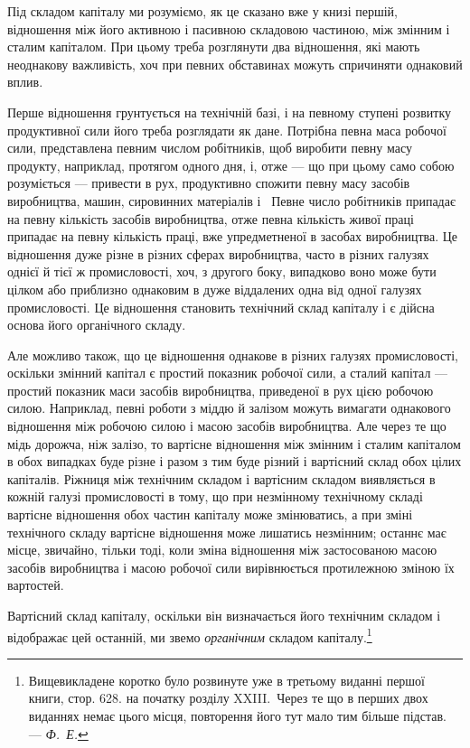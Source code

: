 Під складом капіталу ми розуміємо, як це сказано вже у
книзі першій, відношення між його активною і пасивною складовою
частиною, між змінним і сталим капіталом. При цьому
треба розглянути два відношення, які мають неоднакову важливість,
хоч при певних обставинах можуть спричиняти однаковий
вплив.

Перше відношення грунтується на технічній базі, і на певному
ступені розвитку продуктивної сили його треба розглядати
як дане. Потрібна певна маса робочої сили, представлена
певним числом робітників, щоб виробити певну масу продукту,
наприклад, протягом одного дня, і, отже — що при цьому само
собою розуміється — привести в рух, продуктивно спожити
певну масу засобів виробництва, машин, сировинних матеріалів
і~ Певне число робітників припадає на певну кількість засобів
виробництва, отже певна кількість живої праці припадає
на певну кількість праці, вже упредметненої в засобах виробництва.
Це відношення дуже різне в різних сферах виробництва,
часто в різних галузях однієї й тієї ж промисловості, хоч, з другого
боку, випадково воно може бути цілком або приблизно
однаковим в дуже віддалених одна від одної галузях промисловості.
Це відношення становить технічний склад капіталу і є дійсна
основа його органічного складу.

Але можливо також, що це відношення однакове в різних
галузях промисловості, оскільки змінний капітал є простий показник
робочої сили, а сталий капітал — простий показник маси
засобів виробництва, приведеної в рух цією робочою силою.
Наприклад, певні роботи з міддю й залізом можуть вимагати
однакового відношення між робочою силою і масою засобів
виробництва. Але через те що мідь дорожча, ніж залізо, то вартісне
відношення між змінним і сталим капіталом в обох випадках
буде різне і разом з тим буде різний і вартісний склад
обох цілих капіталів. Ріжниця між технічним складом і вартісним
складом виявляється в кожній галузі промисловості
в тому, що при незмінному технічному складі вартісне відношення
обох частин капіталу може змінюватись, а при зміні
технічного складу вартісне відношення може лишатись незмінним;
останнє має місце, звичайно, тільки тоді, коли зміна
відношення між застосованою масою засобів виробництва і масою
робочої сили вирівнюється протилежною зміною їх вартостей.

Вартісний склад капіталу, оскільки він визначається його
технічним складом і відображає цей останній, ми звемо \emph{органічним}
складом капіталу.\footnote{
Вищевикладене коротко було розвинуте уже в третьому виданні першої
книги, стор. 628. на початку розділу XXIII.~Через
те що в перших двох виданнях немає цього місця, повторення його тут мало
тим більше підстав. — \emph{Ф.~Е.}
}

